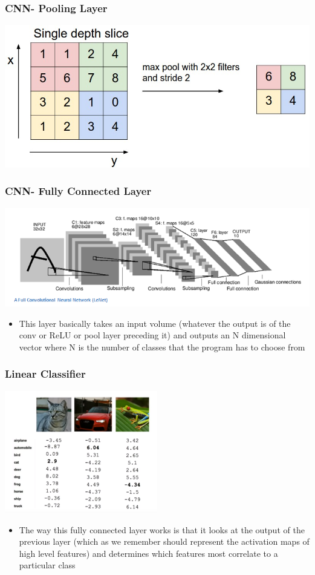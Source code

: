 \documentclass{beamer}
\begin{document}
    \begin{frame}
       \frametitle{CNN- Pooling Layer}
        \centering
          \includegraphics[width=1.0\textwidth]{images/maxpool.jpeg}
    \end{frame}

    \begin{frame}
       \frametitle{CNN- Fully Connected Layer}
        \centering
          \includegraphics[width=1.0\textwidth]{images/LeNet.png}
          \begin{itemize}
           \item This layer basically takes an input volume (whatever the output is of the conv or ReLU or pool layer preceding it) and outputs an N dimensional vector where N is the number of classes that the program has to choose from
       \end{itemize}
    \end{frame}
    
    \begin{frame}
       \frametitle{Linear Classifier}
        \centering
          \includegraphics[width=0.5\textwidth]{images/linearclassifier.PNG}
          \begin{itemize}
              \item The way this fully connected layer works is that it looks at the output of the previous layer (which as we remember should represent the activation maps of high level features) and determines which features most correlate to a particular class
          \end{itemize}
    \end{frame}
    
\end{document}
